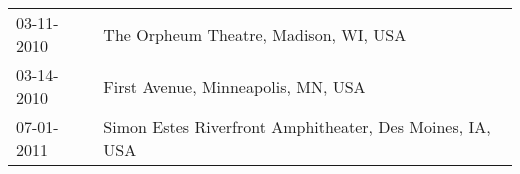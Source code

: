 \begin{supertabular}{ll}
 03-11-2010 &                     The Orpheum Theatre, Madison, WI, USA \\
 03-14-2010 &                        First Avenue, Minneapolis, MN, USA \\
 07-01-2011 &  Simon Estes Riverfront Amphitheater, Des Moines, IA, USA \\
\end{supertabular}
